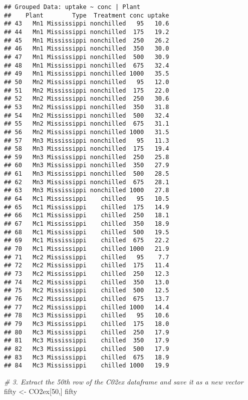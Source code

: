 \documentclass[]{article}
\newenvironment{Shaded}{\begin{snugshade}}{\end{snugshade}}
\newcommand{\CommentTok}[1]{\textcolor[rgb]{0.56,0.35,0.01}{\textit{#1}}}
\newcommand{\DecValTok}[1]{\textcolor[rgb]{0.00,0.00,0.81}{#1}}
\newcommand{\NormalTok}[1]{#1}
\newcommand{\StringTok}[1]{\textcolor[rgb]{0.31,0.60,0.02}{#1}}
\begin{document}
\begin{verbatim}
## Grouped Data: uptake ~ conc | Plant
##    Plant        Type  Treatment conc uptake
## 43   Mn1 Mississippi nonchilled   95   10.6
## 44   Mn1 Mississippi nonchilled  175   19.2
## 45   Mn1 Mississippi nonchilled  250   26.2
## 46   Mn1 Mississippi nonchilled  350   30.0
## 47   Mn1 Mississippi nonchilled  500   30.9
## 48   Mn1 Mississippi nonchilled  675   32.4
## 49   Mn1 Mississippi nonchilled 1000   35.5
## 50   Mn2 Mississippi nonchilled   95   12.0
## 51   Mn2 Mississippi nonchilled  175   22.0
## 52   Mn2 Mississippi nonchilled  250   30.6
## 53   Mn2 Mississippi nonchilled  350   31.8
## 54   Mn2 Mississippi nonchilled  500   32.4
## 55   Mn2 Mississippi nonchilled  675   31.1
## 56   Mn2 Mississippi nonchilled 1000   31.5
## 57   Mn3 Mississippi nonchilled   95   11.3
## 58   Mn3 Mississippi nonchilled  175   19.4
## 59   Mn3 Mississippi nonchilled  250   25.8
## 60   Mn3 Mississippi nonchilled  350   27.9
## 61   Mn3 Mississippi nonchilled  500   28.5
## 62   Mn3 Mississippi nonchilled  675   28.1
## 63   Mn3 Mississippi nonchilled 1000   27.8
## 64   Mc1 Mississippi    chilled   95   10.5
## 65   Mc1 Mississippi    chilled  175   14.9
## 66   Mc1 Mississippi    chilled  250   18.1
## 67   Mc1 Mississippi    chilled  350   18.9
## 68   Mc1 Mississippi    chilled  500   19.5
## 69   Mc1 Mississippi    chilled  675   22.2
## 70   Mc1 Mississippi    chilled 1000   21.9
## 71   Mc2 Mississippi    chilled   95    7.7
## 72   Mc2 Mississippi    chilled  175   11.4
## 73   Mc2 Mississippi    chilled  250   12.3
## 74   Mc2 Mississippi    chilled  350   13.0
## 75   Mc2 Mississippi    chilled  500   12.5
## 76   Mc2 Mississippi    chilled  675   13.7
## 77   Mc2 Mississippi    chilled 1000   14.4
## 78   Mc3 Mississippi    chilled   95   10.6
## 79   Mc3 Mississippi    chilled  175   18.0
## 80   Mc3 Mississippi    chilled  250   17.9
## 81   Mc3 Mississippi    chilled  350   17.9
## 82   Mc3 Mississippi    chilled  500   17.9
## 83   Mc3 Mississippi    chilled  675   18.9
## 84   Mc3 Mississippi    chilled 1000   19.9
\end{verbatim}

\begin{Shaded}
\begin{Highlighting}[]
\CommentTok{# 3. Extract the 50th row of the C02ex dataframe and save it as a new vector}
\NormalTok{fifty <-}\StringTok{ }\NormalTok{CO2ex[}\DecValTok{50}\NormalTok{,]}
\NormalTok{fifty}
\end{Highlighting}
\end{Shaded}
\end{document}
